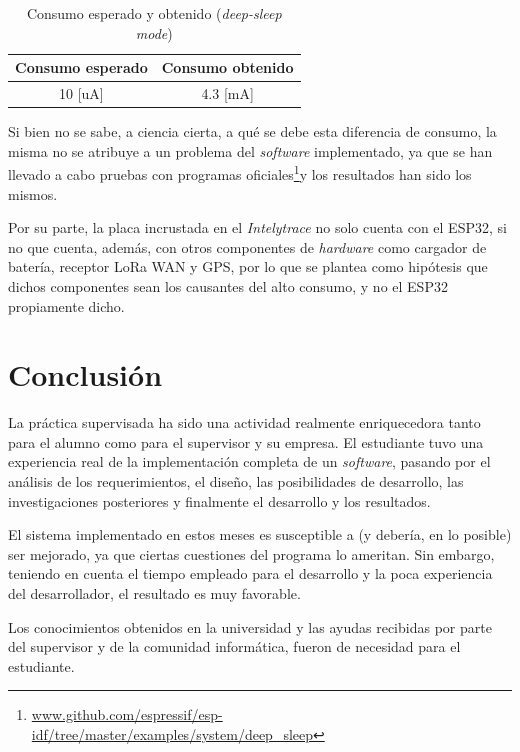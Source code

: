 \documentclass{article}
\newcommand{ \fnejemplos }{\footnote{\url{www.github.com/espressif/esp-idf/tree/master/examples/system/deep_sleep}}}
\begin{document}
    \begin{table}[h]
        \centering
        \begin{tabular}{||c|c||} 
            \hline
            Consumo esperado & Consumo obtenido \\ [0.5ex] 
            \hline\hline
            10 [uA] & 4.3 [mA] \\
            \hline
        \end{tabular}
        \caption{Consumo esperado y obtenido (\emph{deep-sleep mode})}
        \label{tab:consumo}
    \end{table}

    Si bien no se sabe, a ciencia cierta, a qué se debe esta diferencia de 
    consumo, la misma no se atribuye a un problema del \emph{software} 
    implementado, ya que se han llevado a cabo pruebas con programas 
    oficiales\fnejemplos y los resultados han sido los mismos. \par
    Por su parte, la placa incrustada en el \emph{Intelytrace} no solo cuenta 
    con el ESP32, si no que cuenta, además, con otros componentes de 
    \emph{hardware} como cargador de batería, receptor LoRa WAN y GPS, por lo 
    que se plantea como hipótesis que dichos componentes sean los causantes del 
    alto consumo, y no el ESP32 propiamente dicho.


    \newpage
    \section{Conclusión}

    La práctica supervisada ha sido una actividad realmente enriquecedora tanto
    para el alumno como para el supervisor y su empresa. El estudiante tuvo una
    experiencia real de la implementación completa de un \emph{software}, 
    pasando por el análisis de los requerimientos, el diseño, las posibilidades
    de desarrollo, las investigaciones posteriores y finalmente el desarrollo y
    los resultados. \par
    El sistema implementado en estos meses es susceptible a (y debería, en lo 
    posible) ser mejorado, ya que ciertas cuestiones del programa lo ameritan.
    Sin embargo, teniendo en cuenta el tiempo empleado para el desarrollo y la
    poca experiencia del desarrollador, el resultado es muy favorable. \par
    Los conocimientos obtenidos en la universidad y las ayudas recibidas por
    parte del supervisor y de la comunidad informática, fueron de necesidad para
    el estudiante.

\end{document}
